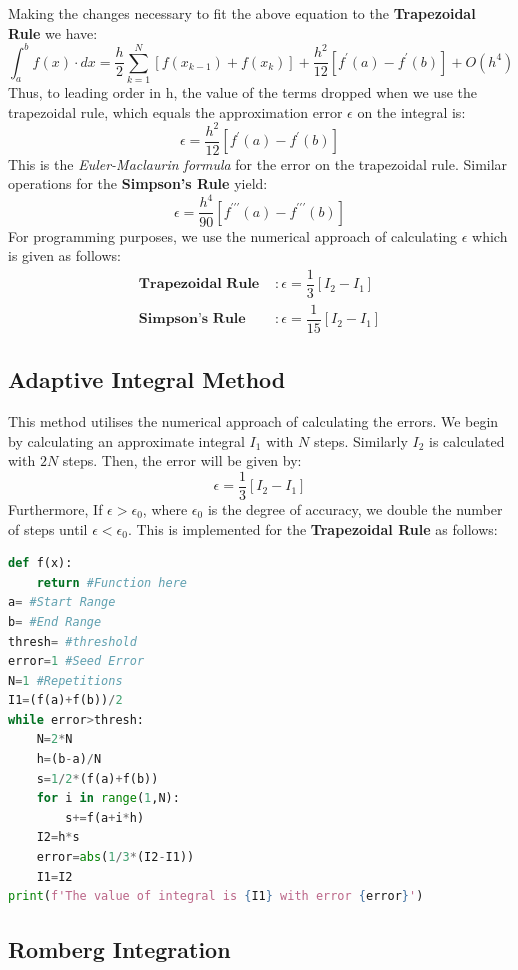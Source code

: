 \par Making the changes necessary to fit the above equation to the \textbf{Trapezoidal Rule} we have:
\[\int_{a}^{b}f(x)\cdot dx = \dfrac{h}{2}\sum_{k=1}^{N}[f(x_{k-1})+f(x_{k})]+\dfrac{h^{2}}{12}[f^{'}(a)-f^{'}(b)] +O(h^{4})
\]
Thus, to leading order in h, the value of the terms dropped when we use the trapezoidal rule, which equals the approximation error $\epsilon$ on the integral is:
\[ \epsilon=\dfrac{h^{2}}{12}[f^{'}(a)-f^{'}(b)]\]
This is the \textit{Euler-Maclaurin formula} for the error on the trapezoidal rule. Similar operations for the \textbf{Simpson's Rule} yield:
\[ \epsilon=\dfrac{h^{4}}{90}[f^{\prime\prime\prime}(a)-f^{\prime\prime\prime}(b)] \]
For programming purposes, we use the numerical approach of calculating $\epsilon$ which is given as follows:
\[\begin{split}
\textbf{Trapezoidal Rule }&: \epsilon=\dfrac{1}{3}[I_{2}-I_{1}] \\
\textbf{Simpson's Rule }&: \epsilon=\dfrac{1}{15}[I_{2}-I_{1}]
 \end{split}
 \]

\subsection{Adaptive Integral Method}
\label{subsec:3.4}
This method utilises the numerical approach of calculating the errors. We begin by calculating an approximate integral $I_{1}$ with $N$ steps. Similarly $I_{2}$ is calculated with $2N$ steps. Then, the error will be given by:$$\epsilon=\dfrac{1}{3}[I_{2}-I_{1}]$$ Furthermore, If $\epsilon>\epsilon_{0}$, where $\epsilon_{0}$ is the degree of accuracy, we double the number of steps until $\epsilon<\epsilon_{0}$. This is implemented for the \textbf{Trapezoidal Rule} as follows:
\begin{lstlisting}[language=Python, caption=Adaptive Rule, frame=single, label={lst:L7} ]
def f(x):
	return #Function here
a= #Start Range
b= #End Range
thresh= #threshold
error=1 #Seed Error
N=1 #Repetitions
I1=(f(a)+f(b))/2
while error>thresh:
	N=2*N
	h=(b-a)/N
	s=1/2*(f(a)+f(b))
	for i in range(1,N):
		s+=f(a+i*h)
	I2=h*s
	error=abs(1/3*(I2-I1))
	I1=I2
print(f'The value of integral is {I1} with error {error}')
\end{lstlisting}
\newpage
\subsection{Romberg Integration}





